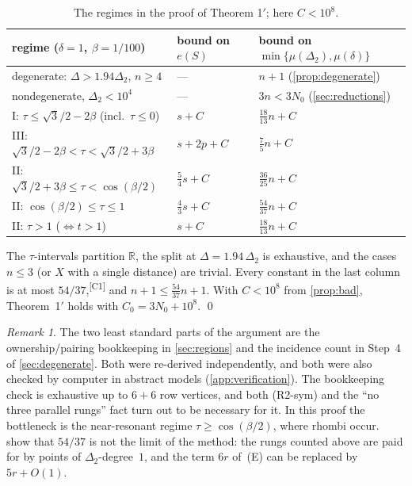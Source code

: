 \documentclass[11pt]{amsart}
\theoremstyle{definition}
\theoremstyle{remark}
\newtheorem{remark}[theorem]{Remark}
\newcommand{\R}{\mathbb{R}}
\newcommand{\Dt}{\Delta_2}
\newcommand{\mult}{\mu}
\newcommand{\chk}[1]{\textsuperscript{[#1]}}
\begin{document}
\begin{table}[ht]
\centering
\renewcommand{\arraystretch}{1.2}
\begin{tabular}{@{}lll@{}}
\toprule
regime ($\delta=1$, $\beta=1/100$) & bound on $e(S)$ & bound on $\min\{\mult(\Dt),\mult(\delta)\}$\\
\midrule
degenerate: $\Delta>1.94\Dt$, $n\ge4$ & --- & $n+1$ (\cref{prop:degenerate})\\
nondegenerate, $\Dt<10^4$ & --- & $3n<3N_0$ (\cref{sec:reductions})\\
I: $\tau\le\sqrt3/2-2\beta$ (incl.\ $\tau\le0$) & $s+C$ & $\frac{18}{13}n+C$\\
III: $\sqrt3/2-2\beta<\tau<\sqrt3/2+3\beta$ & $s+2p+C$ & $\frac75n+C$\\
II: $\sqrt3/2+3\beta\le\tau<\cos(\beta/2)$ & $\frac54s+C$ & $\frac{36}{25}n+C$\\
II: $\cos(\beta/2)\le\tau\le1$ & $\frac43s+C$ & $\frac{54}{37}n+C$\\
II: $\tau>1$ ($\Leftrightarrow t>1$) & $s+C$ & $\frac{18}{13}n+C$\\
\bottomrule
\end{tabular}
\caption{The regimes in the proof of Theorem 1$'$; here $C<10^8$.}
\end{table}

The $\tau$-intervals partition $\R$, the split at $\Delta=1.94\,\Dt$ is exhaustive, and the cases $n\le3$ (or $X$ with a single distance) are trivial. Every constant in the last column is at most $54/37$,\chk{C1} and $n+1\le\frac{54}{37}n+1$. With $C<10^8$ from \cref{prop:bad}, Theorem~1$'$ holds with $C_0=3N_0+10^8$. \qed

\begin{remark}
The two least standard parts of the argument are the ownership/pairing bookkeeping in \cref{sec:regions} and the incidence count in Step~4 of \cref{sec:degenerate}. Both were re-derived independently, and both were also checked by computer in abstract models (\cref{app:verification}). The bookkeeping check is exhaustive up to $6+6$ row vertices, and both (R2-sym) and the ``no three parallel rungs'' fact turn out to be necessary for it. In this proof the bottleneck is the near-resonant regime $\tau\ge\cos(\beta/2)$, where rhombi occur.  show that $54/37$ is not the limit of the method: the rungs counted above are paid for by points of $\Dt$-degree~$1$, and the term $6r$ of~(E) can be replaced by $5r+O(1)$.
\end{remark}
\end{document}
